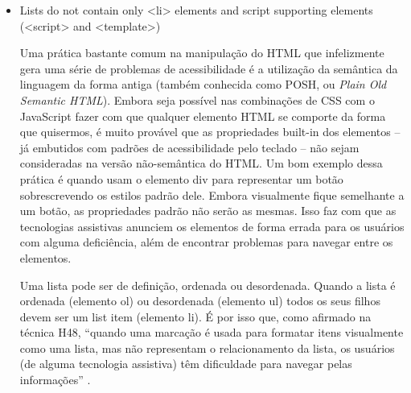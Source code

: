 \documentclass[
	12pt,				%
	openright,			%
	oneside,			%
	a4paper,			%
	chapter=TITLE,		%
	section=TITLE,		%
	subsection=TITLE,	%
	subsubsection=TITLE,%
	english,			%
	brazil				%
	]{abntex2}
\theoremstyle{definition}
\begin{document}
\begin{itemize}
Para resolver esse problema basta adicionar algum valor ao atributo alt da tag img. Alternativamente, também é possível utilizar a aria-label, considerando que é uma situação muito próxima da analisada anteriormente no ponto 5.2.10, onde era necessário um texto descritivo para o elemento sem que ele fosse renderizado de fato na página. A figura \ref{Acréscimo de aria-label a um link sem texto descritivo} representa a implementação dessa solução.

\begin{figure}[!h]
\centering
\caption{Acréscimo de aria-label a um link sem texto descritivo}
\label{Acréscimo de aria-label a um link sem texto descritivo}
\end{figure}

\pagebreak

 \item Lists do not contain only <li> elements and script supporting elements (<script> and <template>)
   
Uma prática bastante comum na manipulação do HTML que infelizmente gera uma série de problemas de acessibilidade é a utilização da semântica da linguagem da forma antiga (também conhecida como POSH, ou \textit{Plain Old Semantic HTML}). Embora seja possível nas combinações de CSS com o JavaScript fazer com que qualquer elemento HTML se comporte da forma que quisermos, é muito provável que as propriedades built-in dos elementos – já embutidos com padrões de acessibilidade pelo teclado – não sejam consideradas na versão não-semântica do HTML. Um bom exemplo dessa prática é quando usam o elemento div para representar um botão sobrescrevendo os estilos padrão dele. Embora visualmente fique semelhante a um botão, as propriedades padrão não serão as mesmas. Isso faz com que as tecnologias assistivas anunciem os elementos de forma errada para os usuários com alguma deficiência, além de encontrar problemas para navegar entre os elementos.

Uma lista pode ser de definição, ordenada ou desordenada. Quando a lista é ordenada (elemento ol) ou desordenada (elemento ul) todos os seus filhos devem ser um list item  (elemento li). É por isso que, como  afirmado na técnica H48, “quando uma marcação é usada para formatar itens visualmente como uma lista, mas  não representam o relacionamento da lista, os usuários (de alguma tecnologia assistiva) têm dificuldade para navegar pelas informações” \cite{cooper2010techniques}.


\end{itemize}
\end{document}
